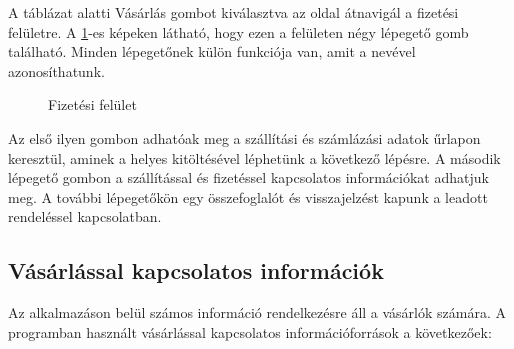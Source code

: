 \bigskip
A táblázat alatti Vásárlás gombot kiválasztva az oldal átnavigál a fizetési felületre. A  \ref{fig.exemple-12}-es képeken látható, hogy ezen a felületen négy lépegető gomb található. Minden lépegetőnek külön funkciója van, amit a nevével azonosíthatunk.
\begin{figure}[H]
	\centering
	\hspace{5pt}
	\caption{Fizetési felület}
	\label{fig.exemple-12}
\end{figure}

Az első ilyen gombon adhatóak meg a szállítási és számlázási adatok űrlapon keresztül, aminek a helyes kitöltésével léphetünk a következő lépésre. A második lépegető gombon a szállítással és fizetéssel kapcsolatos információkat adhatjuk meg. A további lépegetőkön egy összefoglalót és visszajelzést kapunk a leadott rendeléssel kapcsolatban.

\label{section:shopping}
\subsection{Vásárlással kapcsolatos információk}
Az alkalmazáson belül számos információ rendelkezésre áll a vásárlók számára. A programban használt vásárlással kapcsolatos információforrások a következőek:

